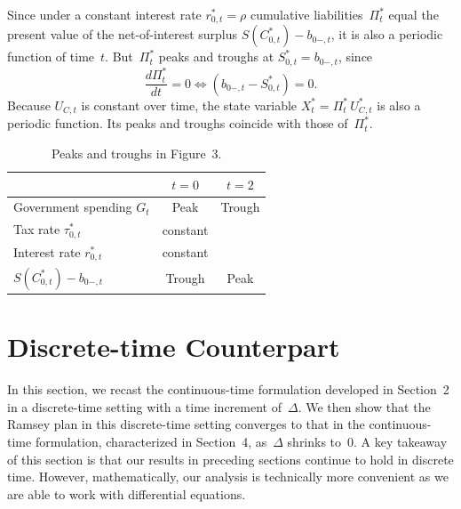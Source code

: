 \documentclass[12pt]{article}
\begin{document}
{{{Since under a constant interest rate $r_{0,t}^* = \rho$ cumulative liabilities~$\Pi_t^*$ equal the present value of the net-of-interest surplus $S(C_{0,t}^*)-b_{0-,t}$, it is also a periodic function of time~$t$. But~$\Pi_t^*$ peaks and troughs at $S_{0,t}^* = b_{0-,t}$, since
\begin{equation}\label{eq:A20}
\frac{d\Pi_t^*}{dt} = 0 \iff (b_{0-,t}-S_{0,t}^*) = 0.
\end{equation}
Because $U_{C,t}$ is constant over time, the state variable $X_t^* = \Pi_t^*\, U_{C,t}^*$ is also a periodic function. Its peaks and troughs coincide with those of~$\Pi_t^*$.

\begin{table}[h]
	\centering
	\caption{Peaks and troughs in Figure~3.}
	\begin{tabular}{lcc}
		\hline
		& $t=0$ & $t=2$ \\
		\hline
		Government spending $G_t$ & Peak & Trough \\
		Tax rate $\tau_{0,t}^*$ & constant & \\
		Interest rate $r_{0,t}^*$ & constant & \\
		$S(C_{0,t}^*)-b_{0-,t}$ & Trough & Peak \\
		\hline
	\end{tabular}
\end{table}




\section{Discrete-time Counterpart}%
\label{sec:discrete_cts}

In this section, we recast the continuous-time formulation developed in Section~2 in a discrete-time setting with a time increment of~$\Delta$. We then show that the Ramsey plan in this discrete-time setting converges to that in the continuous-time formulation, characterized in Section~4, as~$\Delta$ shrinks to~0. A key takeaway of this section is that our results in preceding sections continue to hold in discrete time. However, mathematically, our analysis is technically more convenient as we are able to work with differential equations.

}}}
\end{document}
